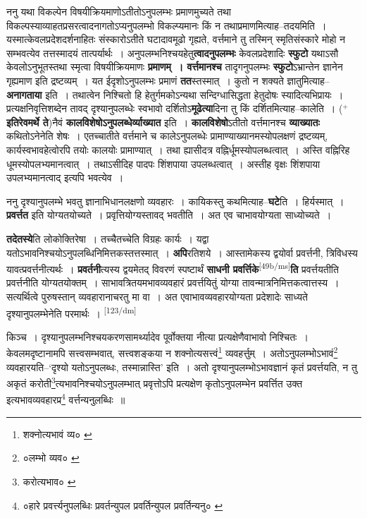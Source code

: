 \documentclass[article,12pt,a4paper]{memoir}
\newcommand{\add}[1]{($^{+}$#1)}
\begin{document}
	  \pstart ननु यथा विकल्पेन विषयीक्रियमाणोऽतीतोऽनुपलम्भः प्रमाणमुच्यते तथा विकल्पस्याव्याहतप्रसरत्वादनागतोऽप्यनुपलम्भो विकल्प्यमानः किं न तथाप्रमाणमित्याह--तदयमिति । यस्मात्केवलप्रदेशदर्शनाहितः संस्कारोऽतीते घटादावमूढो गृह्यते, वर्त्तमाने तु तस्मिन् स्मृतिसंस्कारे मोहो न सम्भवत्येव तत्तस्मादयं तात्पर्यार्थः । अनुपलम्भनिश्चयहेतु\textbf{त्वादनुपलम्भः} केवलप्रदेशादिः \textbf{स्फुटो} यथाऽसौ केवलोऽनुभूतस्तथा स्मृत्वा विषयीक्रियमाणः \textbf{प्रमाणम् । वर्त्तमानश्च} तादृगनुपलम्भः \textbf{स्फुटो}ऽभ्रान्तेन ज्ञानेन गृह्यमाण इति द्रष्टव्यम् । यत ईदृशोऽनुपलम्भः प्रमाणं \textbf{तत}स्तस्मात् । कुतो न शक्यते ज्ञातुमित्याह--\textbf{अनागताया} इति । तथात्वेन निश्चितो हि हेतुर्गमकोऽन्यथा सन्दिग्धासिद्धता हेतुदोषः स्यादित्यभिप्रायः । प्रत्यक्षनिवृत्तिशब्देन तावद् दृश्यानुपलब्धेः स्वभावो दर्शितोऽ\textbf{मूढेत्या}दिना तु किं दर्शितमित्याह--कालेति । \add{\textbf{इतिरेवमर्थे ते}}नैवं \textbf{कालविशेषोऽनुपलब्धेर्व्याख्यात} इति । \textbf{कालविशेषो}ऽतीतो वर्त्तमानश्च \textbf{व्याख्यातः} कथितोऽनेनेति शेषः । एतच्चातीते वर्त्तमाने च कालेऽनुपलब्धेः प्रामाण्याख्यानमस्योपलक्षणं द्रष्टव्यम्, कार्यस्वभावहेत्वोरपि तयोः कालयोः प्रामाण्यात् । तथा ह्यासीदत्र वह्निर्धूमस्योपलब्धत्वात् । अस्ति वह्निरिह धूमस्योपलभ्यमानत्वात् । तथाऽसीदिह पादपः शिंशपाया उपलब्धत्वात् । अस्तीह वृक्षः शिंशपाया उपलभ्यमानत्वाद् इत्यपि भवत्येव ।
	\pend
      

	  \pstart ननु दृश्यानुपलम्भे भवतु ज्ञानाभिधानलक्षणो व्यवहारः । कायिकस्तु कथमित्याह--\textbf{घटे}ति । हिर्यस्मात् । \textbf{प्रवर्त्तत} इति योग्यतयोच्यते । प्रवृत्तियोग्यस्तावद् भवतीति । अत एव चाभावयोग्यता साध्योच्यते ।
	\pend
      

	  \pstart \textbf{तदेतस्ये}ति लोकोक्तिरेषा । तच्चैतच्चेति विग्रहः कार्यः । यद्वा यतोऽभावनिश्चयोऽनुपलब्धिनिमित्तकस्तत्तस्मात् । \textbf{अपि}रतिशये । आस्तामेकस्य द्वयोर्वा प्रवर्त्तनी, त्रिविधस्य यावत्प्रवर्त्तनीत्यर्थः । \textbf{प्रवर्तनी}त्यस्य द्वयमेतद् विवरणं स्पष्टार्थं \textbf{साधनी प्रवर्त्तिके}\leavevmode\textsuperscript{\rmlatinfont\tiny [49b/ms]}\textbf{ति} प्रवर्त्तयतीति प्रवर्त्तनीति योग्यतयोक्तम् । साभावत्रितयमभावव्यवहारं प्रवर्त्तयितुं योग्या तावन्मात्रनिमित्तकत्वात्तस्य । सत्यर्थित्वे पुरुषस्तान् व्यवहारानाचरतु मा वा । अत एवाभावव्यवहारयोग्यता प्रदेशादेः साध्यते दृश्यानुपलम्भेनेति परमार्थः ।
	\pend
      \leavevmode\textsuperscript{\rmlatinfont\tiny [123/dm]}

	  \pstart किञ्च । दृश्यानुपलम्भनिश्चयकरणसामर्थ्यादेव पूर्वोक्तया नीत्या प्रत्यक्षेणैवाभावो निश्चितः । केवलमदृष्टानामपि सत्त्वसम्भवात्, सत्त्वशङ्कया न शक्नोत्यसत्त्वं\footnote{शक्नोत्यभावं व्य० \cite{dp-msC}} व्यवहर्त्तुम् । अतोऽनुपलम्भोऽभावं\footnote{०लम्भो व्यव० \cite{dp-msA}} व्यवहारयति--‘दृश्यो यतोऽनुपलब्धः, तस्मान्नास्ति’ इति । अतो दृश्यानुपलम्भोऽभावज्ञानं कृतं प्रवर्त्तयति, न तु अकृतं करोती\footnote{करोत्यभाव० \cite{dp-msC}}त्यभावनिश्चयोऽनुपलम्भात् प्रवृत्तोऽपि प्रत्यक्षेण कृतोऽनुपलम्भेन प्रवर्त्तित उक्त इत्यभावव्यवहारप्र\footnote{०हारे प्रवर्त्त्यनुपलब्धिः \cite{dp-msC} प्रवर्तन्युपल \cite{dp-msA} प्रवर्तिन्युपल \cite{dp-edP} \cite{dp-edH} प्रवर्तिन्यनु० \cite{dp-msB}} वर्त्तन्यनुलब्धिः ॥
	\pend
       
\end{document}
